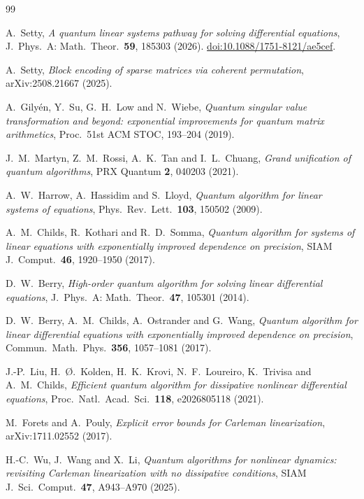 \documentclass[11pt,a4paper]{article}
\theoremstyle{plain}
\theoremstyle{definition}
\theoremstyle{remark}
\begin{document}
\begin{thebibliography}{99}
\small

A.~Setty,
\emph{A quantum linear systems pathway for solving differential equations},
J.~Phys.~A: Math.\ Theor.\ \textbf{59}, 185303 (2026).
\href{https://doi.org/10.1088/1751-8121/ae5cef}{doi:10.1088/1751-8121/ae5cef}.

A.~Setty,
\emph{Block encoding of sparse matrices via coherent permutation},
arXiv:2508.21667 (2025).

A.~Gily\'en, Y.~Su, G.~H.~Low and N.~Wiebe,
\emph{Quantum singular value transformation and beyond: exponential improvements
for quantum matrix arithmetics},
Proc.\ 51st ACM STOC, 193--204 (2019).

J.~M.~Martyn, Z.~M.~Rossi, A.~K.~Tan and I.~L.~Chuang,
\emph{Grand unification of quantum algorithms},
PRX Quantum \textbf{2}, 040203 (2021).

A.~W.~Harrow, A.~Hassidim and S.~Lloyd,
\emph{Quantum algorithm for linear systems of equations},
Phys.\ Rev.\ Lett.\ \textbf{103}, 150502 (2009).

A.~M.~Childs, R.~Kothari and R.~D.~Somma,
\emph{Quantum algorithm for systems of linear equations with exponentially
improved dependence on precision},
SIAM J.\ Comput.\ \textbf{46}, 1920--1950 (2017).

D.~W.~Berry,
\emph{High-order quantum algorithm for solving linear differential equations},
J.~Phys.~A: Math.\ Theor.\ \textbf{47}, 105301 (2014).

D.~W.~Berry, A.~M.~Childs, A.~Ostrander and G.~Wang,
\emph{Quantum algorithm for linear differential equations with exponentially
improved dependence on precision},
Commun.\ Math.\ Phys.\ \textbf{356}, 1057--1081 (2017).

J.-P.~Liu, H.~{\O}.~Kolden, H.~K.~Krovi, N.~F.~Loureiro, K.~Trivisa and
A.~M.~Childs,
\emph{Efficient quantum algorithm for dissipative nonlinear differential
equations},
Proc.\ Natl.\ Acad.\ Sci.\ \textbf{118}, e2026805118 (2021).

M.~Forets and A.~Pouly,
\emph{Explicit error bounds for Carleman linearization},
arXiv:1711.02552 (2017).

H.-C.~Wu, J.~Wang and X.~Li,
\emph{Quantum algorithms for nonlinear dynamics: revisiting Carleman
linearization with no dissipative conditions},
SIAM J.\ Sci.\ Comput.\ \textbf{47}, A943--A970 (2025).


\end{thebibliography}
\end{document}
